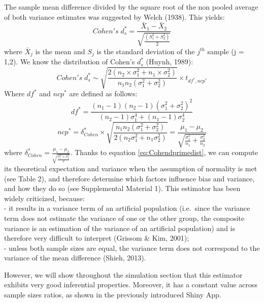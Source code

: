 \documentclass[
  english,
  man,floatsintext]{apa6}
\begin{document}
The sample mean difference divided by the square root of the non pooled average of both variance estimates was suggested by Welch (1938). This yields:
\begin{equation*} 
Cohen's \; d^*_s = \frac{\bar{X}_{1} - \bar{X}_{2}}{ \sqrt{\frac{\left(S^2_{1}+S^2_{2} \right)}{2}}}
\label{eq:Cohenprimeds}
\end{equation*}
where \(\bar{X}_{j}\) is the mean and \(S_j\) is the standard deviation of the \(j^{th}\) sample (j = 1,2). We know the distribution of Cohen's \(d^*_{s}\) (Huynh, 1989):
\begin{equation} 
Cohen's \; d^*_s \sim  \sqrt{\frac{2(n_2\times\sigma^2_1+n_1\times\sigma^2_2)}{n_1n_2(\sigma^2_1+\sigma^2_2)}} \times t_{df^*,ncp^*}
\label{eq:Cohendprimedist}
\end{equation}
Where \(df^*\) and \(ncp^*\) are defined as follows:
\begin{equation} 
df^* = \frac{(n_1-1)(n_2-1)(\sigma^2_1+\sigma^2_2)^2}{(n_2-1)\sigma^4_1+(n_1-1)\sigma^4_2}
\label{eq:Cohendprimedf}
\end{equation}
\begin{equation*} 
ncp^*=\delta^*_{Cohen} \times \sqrt{\frac{n_1n_2(\sigma^2_1+\sigma^2_2)}{2(n_2\sigma^2_1+n_1\sigma^2_2)}}=\frac{\mu_1-\mu_2}{\sqrt{\frac{\sigma_1^2}{n_1}+\frac{\sigma^2_2}{n_2}}}
\label{eq:Cohendprimevst}
\end{equation*}
where \(\delta^*_{Cohen}=\frac{\mu_1-\mu_2}{\sqrt{\frac{\sigma^2_1+\sigma^2_2}{2}}}\). Thanks to equation \ref{eq:Cohendprimedist}, we can compute its theoretical expectation and variance when the assumption of normality is met (see Table 2), and therefore determine which factors influence bias and variance, and how they do so (see Supplemental Material 1). This estimator has been widely criticized, because:\\
- it results in a variance term of an artificial population (i.e.~since the variance term does not estimate the variance of one or the other group, the composite variance is an estimation of the variance of an artificial population) and is therefore very difficult to interpret (Grissom \& Kim, 2001);\\
- unless both sample sizes are equal, the variance term does not correspond to the variance of the mean difference (Shieh, 2013).

However, we will show throughout the simulation section that this estimator exhibits very good inferential properties. Moreover, it has a constant value across sample sizes ratios, as shown in the previously introduced Shiny App.
\end{document}
